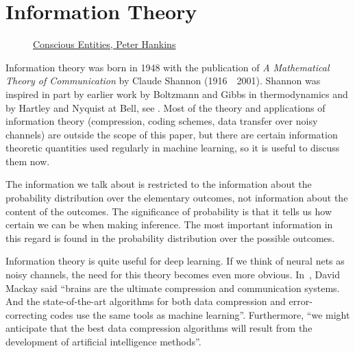 \section{Information Theory}%
\label{sec:information-theory}

\vspace{1cm}

\begin{figure}[h!]%
  \label{fig:info}
  \centering
  \caption{\href{https://www.consciousentities.com/2017/02/consciousness-entropy/}{Conscious
      Entities, Peter Hankins}}
\end{figure}

\vspace{1cm}

\noindent Information theory was born in 1948 with the publication of
\textit{A Mathematical Theory of Communication} by Claude Shannon
(1916~\textendash~2001). Shannon was inspired in part by earlier work
by Boltzmann and Gibbs in thermodynamics and by Hartley and Nyquist at
Bell, see \cite{ref:losee-1997}. Most of the theory and applications of
information theory (compression, coding schemes, data transfer over
noisy channels) are outside the scope of this paper, but there are
certain information theoretic quantities used regularly in machine
learning, so it is useful to discuss them now.

\begin{remark}
  The information we talk about is restricted to the information about
  the probability distribution over the elementary outcomes, not
  information about the content of the outcomes.  The significance of
  probability is that it tells us how certain we can be when making
  inference. The most important information in this regard is found in
  the probability distribution over the possible outcomes.
\end{remark}

Information theory is quite useful for deep learning. If we think of
neural nets as noisy channels, the need for this theory becomes even
more obvious. In~\cite{ref:mackay-2003}, David Mackay said ``brains
are the ultimate compression and communication systems. And the
state-of-the-art algorithms for both data compression and
error-correcting codes use the same tools as machine
learning''. Furthermore, ``we might anticipate that the best data
compression algorithms will result from the development of artificial
intelligence methods''.

